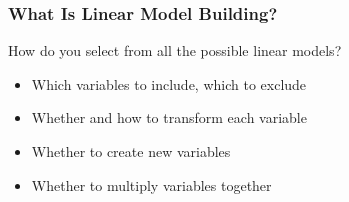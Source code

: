 \documentclass[12pt, block=fill]{beamer}
\begin{document}
\begin{frame}
  \frametitle{What Is Linear Model Building?}

  
  How do you select from all the possible linear models?

  
  \begin{itemize}
  \item Which variables to include, which to exclude
  \item Whether and how to transform each variable
  \item Whether to create new variables
  \item Whether to multiply variables together
  \end{itemize}
  
\end{frame}
\end{document}
